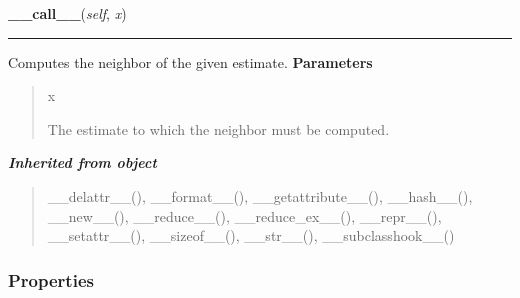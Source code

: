     \label{peach:sa:neighbor:ContinuousNeighbor:__call__}

    \vspace{0.5ex}

\hspace{.8\funcindent}\begin{boxedminipage}{\funcwidth}

    \raggedright \textbf{\_\_call\_\_}(\textit{self}, \textit{x})

    \vspace{-1.5ex}

    \rule{\textwidth}{0.5\fboxrule}
\setlength{\parskip}{2ex}

Computes the neighbor of the given estimate.
\setlength{\parskip}{1ex}
      \textbf{Parameters}
      \vspace{-1ex}

      \begin{quote}
        \begin{Ventry}{x}

          \item[x]


The estimate to which the neighbor must be computed.
        \end{Ventry}

      \end{quote}

    \end{boxedminipage}


\large{\textbf{\textit{Inherited from object}}}

\begin{quote}
\_\_delattr\_\_(), \_\_format\_\_(), \_\_getattribute\_\_(), \_\_hash\_\_(), \_\_new\_\_(), \_\_reduce\_\_(), \_\_reduce\_ex\_\_(), \_\_repr\_\_(), \_\_setattr\_\_(), \_\_sizeof\_\_(), \_\_str\_\_(), \_\_subclasshook\_\_()
\end{quote}


  \subsubsection{Properties}

